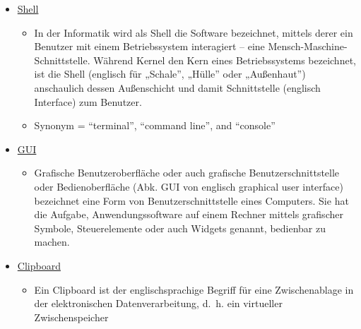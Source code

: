 \documentclass[
]{article}
\providecommand{\tightlist}{%
  \setlength{\itemsep}{0pt}\setlength{\parskip}{0pt}}
\begin{document}
\begin{itemize}
\item
  \href{https://de.wikipedia.org/wiki/Shell_(Betriebssystem)}{Shell}

  \begin{itemize}
  \tightlist
  \item
    In der Informatik wird als Shell die Software bezeichnet,
    mittels derer ein Benutzer mit einem Betriebssystem interagiert
    -- eine Mensch-Maschine-Schnittstelle. Während Kernel den Kern
    eines Betriebssystems bezeichnet, ist die Shell (englisch für
    „Schale'', „Hülle'' oder „Außenhaut'') anschaulich dessen
    Außenschicht und damit Schnittstelle (englisch Interface) zum
    Benutzer.
  \item
    Synonym = ``terminal'', ``command line'', and ``console''
  \end{itemize}
\item
  \href{https://de.wikipedia.org/wiki/Grafische_Benutzeroberfl\%C3\%A4che}{GUI}

  \begin{itemize}
  \tightlist
  \item
    Grafische Benutzeroberfläche oder auch grafische
    Benutzerschnittstelle oder Bedienoberfläche (Abk. GUI von
    englisch graphical user interface) bezeichnet eine Form von
    Benutzerschnittstelle eines Computers. Sie hat die Aufgabe,
    Anwendungssoftware auf einem Rechner mittels grafischer Symbole,
    Steuerelemente oder auch Widgets genannt, bedienbar zu machen.
  \end{itemize}
\item
  \href{https://de.wikipedia.org/wiki/Zwischenablage}{Clipboard}

  \begin{itemize}
  \tightlist
  \item
    Ein Clipboard ist der englischsprachige Begriff für eine
    Zwischenablage in der elektronischen Datenverarbeitung, d.~h.
    ein virtueller Zwischenspeicher
  \end{itemize}
\end{itemize}
\end{document}
